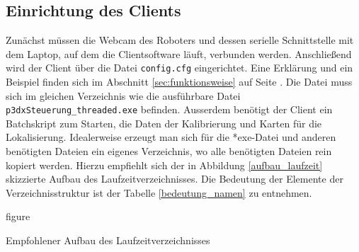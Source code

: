 
\subsection{Einrichtung des Clients}%
\label{sec:einrichtung-client}
Zunächst müssen die Webcam des Roboters und dessen serielle
Schnittstelle  mit dem Laptop, auf dem die Clientsoftware läuft,
verbunden  werden. Anschließend wird der Client über  die Datei \verb|config.cfg| eingerichtet. Eine
Erklärung und ein Beispiel finden sich im Abschnitt
\ref{sec:funktionsweise} auf Seite \pageref{aufbau_config}. Die Datei
muss sich im gleichen Verzeichnis wie die ausführbare Datei
\verb|p3dxSteuerung_threaded.exe| befinden. Ausserdem benötigt der
Client ein Batchskript zum Starten, die
Daten der Kalibrierung und Karten für die Lokalisierung. Idealerweise
erzeugt man sich für die *exe-Datei und anderen benötigten Dateien ein
eigenes Verzeichnis, wo alle benötigten Dateien rein kopiert werden.  Hierzu
empfiehlt sich der in Abbildung \ref{aufbau_laufzeit} skizzierte
Aufbau des Laufzeitverzeichnisses. Die Bedeutung der Elemente der
Verzeichnisstruktur ist der Tabelle \ref{bedeutung_namen} zu entnehmen.
\begin{nofloat}{figure}%
\label{aufbau_laufzeit}
\centering
{}
\caption{Empfohlener Aufbau des Laufzeitverzeichnisses}  
\end{nofloat}

